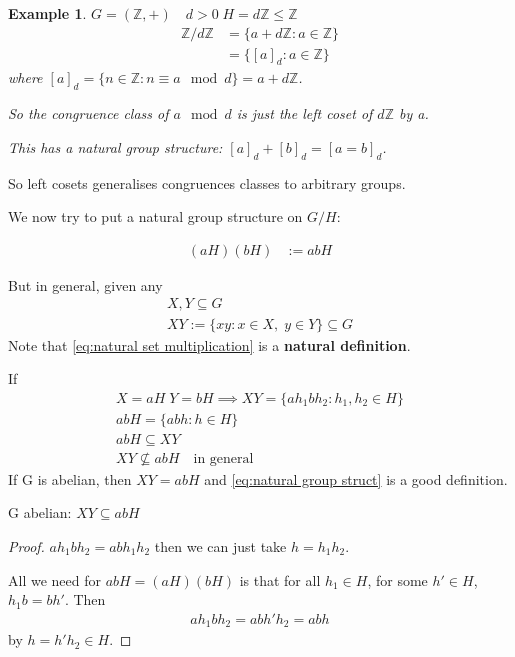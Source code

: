 \documentclass[11pt, oneside]{book}
\theoremstyle{break}
\newtheorem*{proof}{Proof}
\newtheorem{eg}{Example}[section]
\newcommand{\bb}[1]{\mathbb{#1}}			%
\begin{document}
\begin{eg}
    $G = (\bb{Z}, +) \quad d > 0 \; H = d\bb{Z} \leq \bb{Z}$
    \begin{align}
        \bb{Z} / d\bb{Z} &= \{a + d\bb{Z} : a \in \bb{Z} \} \\
                    &= \{ [a]_d : a \in \bb{Z} \}
    \end{align}
    where $[a]_d = \{n \in \bb{Z} : n \equiv a \mod d\} = a + d\bb{Z}$.

    So the congruence class of $a \mod d$ is just the left coset of $d \bb{Z}$ by a.

    This has a natural group structure: $[a]_d + [b]_d = [a = b]_d$.
\end{eg}

So left cosets generalises congruences classes to arbitrary groups.

We now try to put a natural group structure on $G/H$:

\begin{align}\label{eq:natural group struct}
    (aH)(bH) &:= abH
\end{align}

But in general, given any
\begin{gather}
    X, Y \subseteq G \nonumber \\
    XY := \{ xy : x \in X, \; y \in Y\} \subseteq G \label{eq:natural set multiplication}
\end{gather}
Note that \autoref{eq:natural set multiplication} is a \textbf{natural definition}.

If
\begin{gather*}
    X = aH \; Y = bH \implies XY = \{ah_1 bh_2 : h_1, h_2 \in H \} \\
    abH = \{abh : h \in H\} \\
    abH \subseteq XY \\
    XY \not\subseteq abH \quad \text{in general}
\end{gather*}
If G is abelian, then $XY = abH$ and \autoref{eq:natural group struct} is a good definition.

G abelian: $XY \subseteq abH$

\begin{proof}
    $ah_1bh_2 = abh_1h_2$ then we can just take $h = h_1h_2$.

    All we need for $abH = (aH)(bH)$ is that for all $h_1 \in H$, for some $h' \in H$, $h_1b = bh'$. Then
    \begin{align*}
        ah_1bh_2 = abh'h_2 = abh
    \end{align*}
    by $h = h'h_2 \in H$.
\end{proof}
\end{document}
